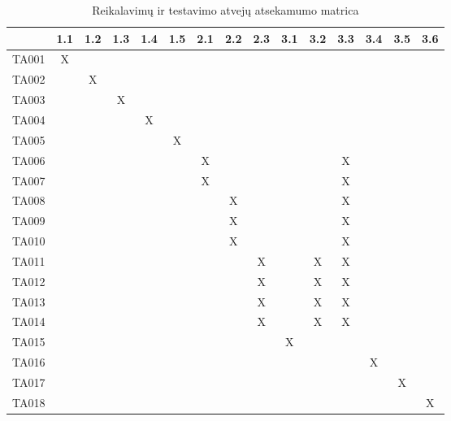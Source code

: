 \begin{table}[h]
  \centering
  \label{table:matrica}
  \begin{tabular}{|c|c|c|c|c|c|c|c|c|c|c|c|c|c|c|}
    \hline
          & 1.1 & 1.2 & 1.3 & 1.4 & 1.5 & 2.1 & 2.2 & 2.3 & 3.1 & 3.2 & 3.3 & 3.4 & 3.5 & 3.6 \\ \hline
    TA001 & X   &     &     &     &     &     &     &     &     &     &     &     &     &     \\ \hline
    TA002 &     & X   &     &     &     &     &     &     &     &     &     &     &     &     \\ \hline
    TA003 &     &     & X   &     &     &     &     &     &     &     &     &     &     &     \\ \hline
    TA004 &     &     &     & X   &     &     &     &     &     &     &     &     &     &     \\ \hline
    TA005 &     &     &     &     & X   &     &     &     &     &     &     &     &     &     \\ \hline
    TA006 &     &     &     &     &     & X   &     &     &     &     & X   &     &     &     \\ \hline
    TA007 &     &     &     &     &     & X   &     &     &     &     & X   &     &     &     \\ \hline
    TA008 &     &     &     &     &     &     & X   &     &     &     & X   &     &     &     \\ \hline
    TA009 &     &     &     &     &     &     & X   &     &     &     & X   &     &     &     \\ \hline
    TA010 &     &     &     &     &     &     & X   &     &     &     & X   &     &     &     \\ \hline
    TA011 &     &     &     &     &     &     &     & X   &     & X   & X   &     &     &     \\ \hline
    TA012 &     &     &     &     &     &     &     & X   &     & X   & X   &     &     &     \\ \hline
    TA013 &     &     &     &     &     &     &     & X   &     & X   & X   &     &     &     \\ \hline
    TA014 &     &     &     &     &     &     &     & X   &     & X   & X   &     &     &     \\ \hline
    TA015 &     &     &     &     &     &     &     &     & X   &     &     &     &     &     \\ \hline
    TA016 &     &     &     &     &     &     &     &     &     &     &     & X   &     &     \\ \hline
    TA017 &     &     &     &     &     &     &     &     &     &     &     &     & X   &     \\ \hline
    TA018 &     &     &     &     &     &     &     &     &     &     &     &     &     & X   \\ \hline
  \end{tabular}
  \caption{Reikalavimų ir testavimo atvejų atsekamumo matrica}
\end{table}
